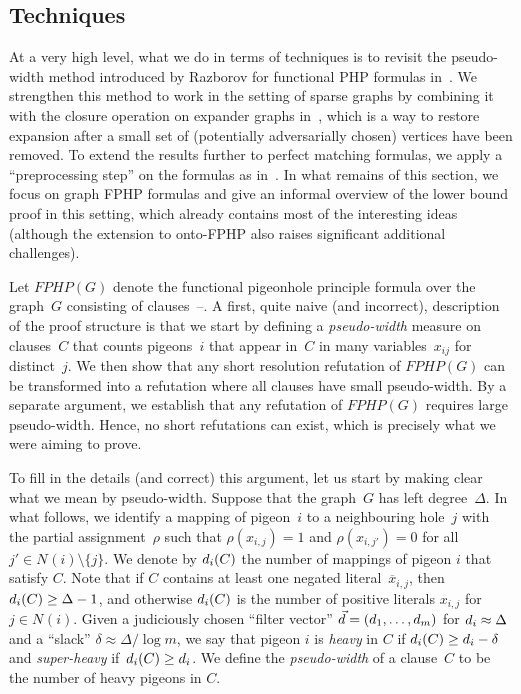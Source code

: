 \documentclass{article}
\newcommand{\set}[1]{\{ #1 \}}
\newcommand{\olnot}[1]{\overline{#1}}
\newcommand{\introduceterm}[1]{{\emph{#1}}}
\newcommand{\clc}{\ensuremath{C}}
\newcommand{\restrrho}{\rho}
\newcommand{\formulaformat}[1]{\mathit{#1}}
\newcommand{\graphfphpnot}[1][G]{\formulaformat{FPHP}({#1})}
\newcommand{\heavy}{heavy\xspace}
\newcommand{\sheavy}{super-heavy\xspace}
\newcommand{\superheavy}{\sheavy}
\newcommand{\GFPHP}{G\text{-}FPHP}
\renewcommand{\GFPHP}{\graphfphpnot[G]}
\newcommand{\neigh}[2][]{N_{{#1}}(#2)}
\newcommand{\GdegMax}{\Delta}
\newcommand{\gdegmax}{\GdegMax}
\newcommand{\thr}[1]{ \ensuremath d_{{#1}} }
\newcommand{\vecthr}{\vec{d}}
\newcommand{\pseudowidth}{pseudo-width\xspace}
\newcommand{\squeezesubsection}[1]{\subsection{#1}}
\numberwithin{equation}{section}
\begin{document}
   
\squeezesubsection{Techniques}
\label{sec:intro_techniques}

At a very high level, what we do in terms of techniques is to revisit
the pseudo-width method introduced by Razborov for functional PHP
formulas in~\cite{Razborov03ResolutionLowerBoundsWFPHP}.  We
strengthen this method to work in the setting of sparse graphs by
combining it with the closure operation on expander
graphs in~\cite{ABRW04Pseudorandom,AR03LowerBounds}, which is a way to
restore expansion after a small set of (potentially adversarially
chosen) vertices have been removed.
To extend the results further to perfect matching formulas, we apply a
``preprocessing step'' on the formulas as
in~\cite{Razborov04ResolutionLowerBoundsPM}. 
In what remains of this section, we focus on graph FPHP formulas and
give an informal overview of the lower bound proof in this setting,
which already contains most of the interesting ideas
(although the extension to onto-FPHP also raises significant
additional challenges).

Let
$\GFPHP$
denote the functional 
pigeonhole principle
formula over the graph~$G$ consisting of 
\mbox{clauses
  --.}
A first, quite naive (and incorrect), description of the proof
structure is that we start by defining a 
\introduceterm{\pseudowidth{}} measure on clauses~$\clc$ that counts
pigeons~$i$ that 
appear  in~$\clc$ in many variables~$x_{ij}$
for distinct~$j$.
We then show that
any short resolution refutation of
$\GFPHP$ can be transformed into a refutation where all clauses have
small \pseudowidth. By a separate argument, 
we establish that any refutation of
$\GFPHP$ 
requires large \pseudowidth.
Hence,  no short refutations can exist, which is precisely what we
were aiming to prove.


To fill in the details (and correct) this argument, let us start by
making clear what we mean by \pseudowidth. 
Suppose that the graph~$G$ has left degree~$\gdegmax$.
In what follows, we 
identify a mapping of pigeon~$i$ to a neighbouring hole~$j$ with the partial
assignment~$\restrrho$ such that
$\restrrho (x_{i,j}) = 1$ and
$\restrrho (x_{i,j'}) = 0$ for all $j' \in \neigh{i} \setminus \set{j}$.
We denote by 
$\thr{i}(\clc)$ 
the number of mappings of pigeon $i$ that
satisfy $\clc$.
Note that if
$\clc$ contains at least
one negated literal~$\olnot{x}_{i,j}$,
then
$\thr{i}(\clc) \geq \gdegmax - 1$,
and otherwise
$\thr{i}(\clc)$
is the number of positive literals
$x_{i,j}$ for $j \in \neigh{i}$.
Given a judiciously  chosen
``filter vector''
$\vecthr =(\thr{1}, \ldots, \thr{m})$
for
$\thr{i} \approx \gdegmax$
and a ``slack''
$\delta \approx \gdegmax / \log m$,
we 
say that
pigeon $i$ is \introduceterm{\heavy{}} in 
$\clc$
if $\thr{i}(\clc) \ge \thr{i} - \delta$ and
\introduceterm{\superheavy{}} 
\mbox{if  $\thr{i}(\clc) \ge \thr{i}$.}
We define the \introduceterm{\pseudowidth{}} of 
a clause~$\clc$ to be
the number of \heavy pigeons in $\clc$.
\end{document}
